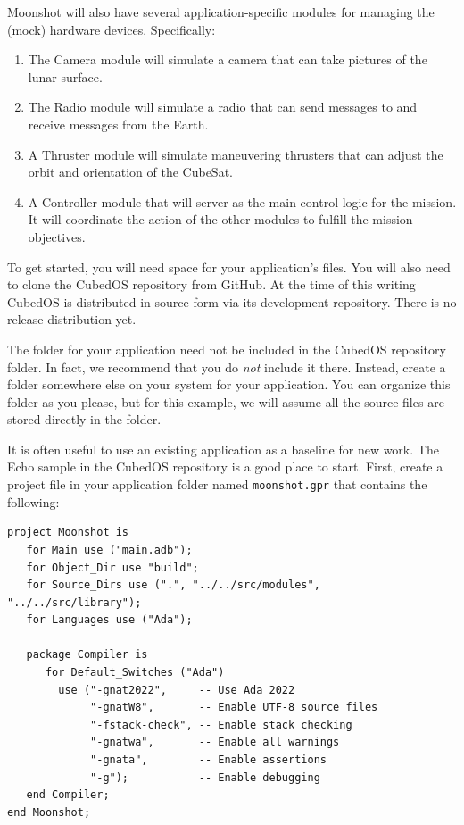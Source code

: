 Moonshot will also have several application-specific modules for managing the (mock) hardware
devices. Specifically:
\begin{enumerate}
  \item The Camera module will simulate a camera that can take pictures of the lunar surface.

  \item The Radio module will simulate a radio that can send messages to and receive messages
  from the Earth.

  \item A Thruster module will simulate maneuvering thrusters that can adjust the orbit and
  orientation of the CubeSat. 

  \item A Controller module that will server as the main control logic for the mission. It will
  coordinate the action of the other modules to fulfill the mission objectives.
\end{enumerate}

To get started, you will need space for your application's files. You will also need to clone
the CubedOS repository from GitHub. At the time of this writing CubedOS is distributed in source
form via its development repository. There is no release distribution yet.

The folder for your application need not be included in the CubedOS repository folder. In fact,
we recommend that you do \emph{not} include it there. Instead, create a folder somewhere else on
your system for your application. You can organize this folder as you please, but for this
example, we will assume all the source files are stored directly in the folder.

It is often useful to use an existing application as a baseline for new work. The Echo
sample in the CubedOS repository is a good place to start. First, create a project file in
your application folder named \texttt{moonshot.gpr} that contains the following:
\begin{verbatim}
project Moonshot is
   for Main use ("main.adb");
   for Object_Dir use "build";
   for Source_Dirs use (".", "../../src/modules", "../../src/library");
   for Languages use ("Ada");

   package Compiler is
      for Default_Switches ("Ada")
        use ("-gnat2022",     -- Use Ada 2022
             "-gnatW8",       -- Enable UTF-8 source files
             "-fstack-check", -- Enable stack checking
             "-gnatwa",       -- Enable all warnings
             "-gnata",        -- Enable assertions
             "-g");           -- Enable debugging
   end Compiler;
end Moonshot;
\end{verbatim}

